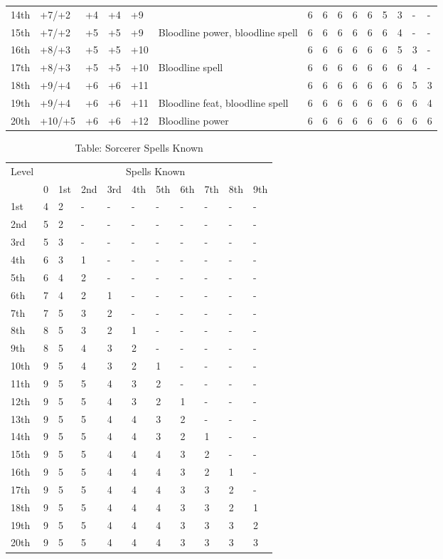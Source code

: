\begin{table*}[]
\begin{tabularx}{\linewidth}{lp{6em}p{2.5em}p{2.5em}p{2.5em}Xlllllllll}
14th & +7/+2 & +4 & +4 & +9 &  & 6 & 6 & 6 & 6 & 6 & 5 & 3 & - & -\\
15th & +7/+2 & +5 & +5 & +9 & Bloodline power, bloodline spell & 6 & 6 & 6 & 6 & 6 & 6 & 4 & - & -\\
16th & +8/+3 & +5 & +5 & +10 &  & 6 & 6 & 6 & 6 & 6 & 6 & 5 & 3 & -\\
17th & +8/+3 & +5 & +5 & +10 & Bloodline spell & 6 & 6 & 6 & 6 & 6 & 6 & 6 & 4 & -\\
18th & +9/+4 & +6 & +6 & +11 &  & 6 & 6 & 6 & 6 & 6 & 6 & 6 & 5 & 3\\
19th & +9/+4 & +6 & +6 & +11 & Bloodline feat, bloodline spell & 6 & 6 & 6 & 6 & 6 & 6 & 6 & 6 & 4\\
20th & +10/+5 & +6 & +6 & +12 & Bloodline power & 6 & 6 & 6 & 6 & 6 & 6 & 6 & 6 & 6\\
\end{tabularx}
\end{table*}

\begin{table}[]
\caption{Table: Sorcerer Spells Known}
\sffamily
\setlength{\tabcolsep}{1pt}
\begin{tabular}{lllllllllll}
Level & \multicolumn{10}{c}{Spells Known}\\
      & 0 & 1st & 2nd & 3rd & 4th & 5th & 6th & 7th & 8th & 9th\\
1st & 4 & 2 & - & - & - & - & - & - & - & -\\
2nd & 5 & 2 & - & - & - & - & - & - & - & -\\
3rd & 5 & 3 & - & - & - & - & - & - & - & -\\
4th & 6 & 3 & 1 & - & - & - & - & - & - & -\\
5th & 6 & 4 & 2 & - & - & - & - & - & - & -\\
6th & 7 & 4 & 2 & 1 & - & - & - & - & - & -\\
7th & 7 & 5 & 3 & 2 & - & - & - & - & - & -\\
8th & 8 & 5 & 3 & 2 & 1 & - & - & - & - & -\\
9th & 8 & 5 & 4 & 3 & 2 & - & - & - & - & -\\
10th & 9 & 5 & 4 & 3 & 2 & 1 & - & - & - & -\\
11th & 9 & 5 & 5 & 4 & 3 & 2 & - & - & - & -\\
12th & 9 & 5 & 5 & 4 & 3 & 2 & 1 & - & - & -\\
13th & 9 & 5 & 5 & 4 & 4 & 3 & 2 & - & - & -\\
14th & 9 & 5 & 5 & 4 & 4 & 3 & 2 & 1 & - & -\\
15th & 9 & 5 & 5 & 4 & 4 & 4 & 3 & 2 & - & -\\
16th & 9 & 5 & 5 & 4 & 4 & 4 & 3 & 2 & 1 & -\\
17th & 9 & 5 & 5 & 4 & 4 & 4 & 3 & 3 & 2 & -\\
18th & 9 & 5 & 5 & 4 & 4 & 4 & 3 & 3 & 2 & 1\\
19th & 9 & 5 & 5 & 4 & 4 & 4 & 3 & 3 & 3 & 2\\
20th & 9 & 5 & 5 & 4 & 4 & 4 & 3 & 3 & 3 & 3\\
\end{tabular}
\end{table}

